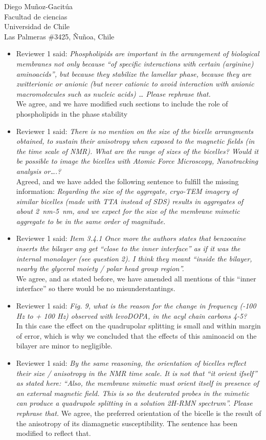 \documentclass{letter}
\begin{document}
\begin{letter}{Diego Muñoz-Gacitúa\\ Facultad de ciencias \\ Universidad de
    Chile \\ Las Palmeras \#3425, Ñuñoa, Chile}
\begin{itemize}
  \item Reviewer 1 said: \textit{Phospholipids are important in the arrangement of biological membranes not only because “of specific interactions with certain (arginine) aminoacids”, but because they stabilize the lamellar phase, because they are zwitterionic or anionic (but never cationic to avoid interaction with anionic macromolecules such as nucleic acids) … Please rephrase that.}\\
  We agree, and we have modified such sections to include the role of
  phospholipids in the phase stability\
 
\item Reviewer 1 said: \textit{There is no mention on the size of the bicelle arrangments obtained, to sustain their anisotropy when exposed to the magnetic fields (in the time scale of NMR). What are the range of sizes of the bicelles? Would it be possible to image the bicelles with Atomic Force Microscopy, Nanotracking analysis or….?}\\
  Agreed, and we have added the following sentence to fulfill the missing
  information: \textit{Regarding the size of the aggregate, cryo-TEM imagery of similar
  bicelles (made with TTA instead of SDS)
  results in aggregates of about
  \SI{2}{nm}-\SI{5}{nm}, and we expect for the size of
  the membrane mimetic aggregate to be in the same order of magnitude.}

\item Reviewer 1 said: \textit{Item 3.4.1 Once more the authors states that
    benzocaine inserts the bilayer ang get ``close to the inner interface'' as if
    it was the internal monolayer (see question 2). I think they meant ``inside the
    bilayer, nearby the glycerol moiety / polar head group region''. }\\
  We agree, and as stated before, we have amended all mentions of this ``inner
  interface'' so there would be no misunderstantings.
  
\item Reviewer 1 said: \textit{Fig. 9, what is the reason for the change in
    frequency (-100 Hz to + 100 Hz) observed with levoDOPA, in the acyl chain
    carbons 4-5?}\\
	In this case the effect on the quadrupolar splitting is small and within margin of error, which is why we concluded that the effects of this aminoacid on the bilayer are minor to negligible.

\item Reviewer 1 said: \textit{By the same reasoning, the orientation of bicelles reflect their size / anisotropy in the NMR time scale. It is not that “it orient ifself” as stated here: “Also, the membrane mimetic must orient itself in presence of an external magnetic field. This is so the deuterated probes in the mimetic can produce a quadrupole splitting in a solution 2H-RMN spectrum”. Please rephrase that.}
We agree, the preferred orientation of the bicelle is the result of the anisotropy of its diamagnetic susceptibility. The sentence has been modified to reflect that.


\end{itemize}
\end{letter}
\end{document}
